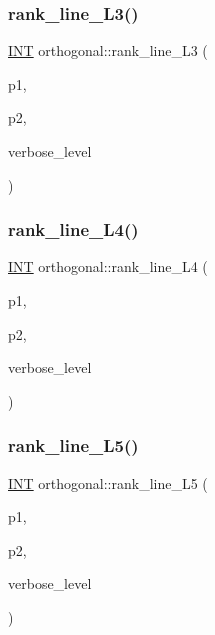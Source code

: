 \subsubsection{\texorpdfstring{rank\+\_\+line\+\_\+\+L3()}{rank\_line\_L3()}}
{\footnotesize\ttfamily \mbox{\hyperlink{galois_8h_a09fddde158a3a20bd2dcadb609de11dc}{I\+NT}} orthogonal\+::rank\+\_\+line\+\_\+\+L3 (\begin{DoxyParamCaption}\item[{\mbox{\hyperlink{galois_8h_a09fddde158a3a20bd2dcadb609de11dc}{I\+NT}}}]{p1,  }\item[{\mbox{\hyperlink{galois_8h_a09fddde158a3a20bd2dcadb609de11dc}{I\+NT}}}]{p2,  }\item[{\mbox{\hyperlink{galois_8h_a09fddde158a3a20bd2dcadb609de11dc}{I\+NT}}}]{verbose\+\_\+level }\end{DoxyParamCaption})}

\mbox{\label{classorthogonal_a80dc34bc12588a8b6e70cf00cd9558a6}} 
\subsubsection{\texorpdfstring{rank\+\_\+line\+\_\+\+L4()}{rank\_line\_L4()}}
{\footnotesize\ttfamily \mbox{\hyperlink{galois_8h_a09fddde158a3a20bd2dcadb609de11dc}{I\+NT}} orthogonal\+::rank\+\_\+line\+\_\+\+L4 (\begin{DoxyParamCaption}\item[{\mbox{\hyperlink{galois_8h_a09fddde158a3a20bd2dcadb609de11dc}{I\+NT}}}]{p1,  }\item[{\mbox{\hyperlink{galois_8h_a09fddde158a3a20bd2dcadb609de11dc}{I\+NT}}}]{p2,  }\item[{\mbox{\hyperlink{galois_8h_a09fddde158a3a20bd2dcadb609de11dc}{I\+NT}}}]{verbose\+\_\+level }\end{DoxyParamCaption})}

\mbox{\label{classorthogonal_a80bcc065004ef76b70cef437fff6f54c}} 
\subsubsection{\texorpdfstring{rank\+\_\+line\+\_\+\+L5()}{rank\_line\_L5()}}
{\footnotesize\ttfamily \mbox{\hyperlink{galois_8h_a09fddde158a3a20bd2dcadb609de11dc}{I\+NT}} orthogonal\+::rank\+\_\+line\+\_\+\+L5 (\begin{DoxyParamCaption}\item[{\mbox{\hyperlink{galois_8h_a09fddde158a3a20bd2dcadb609de11dc}{I\+NT}}}]{p1,  }\item[{\mbox{\hyperlink{galois_8h_a09fddde158a3a20bd2dcadb609de11dc}{I\+NT}}}]{p2,  }\item[{\mbox{\hyperlink{galois_8h_a09fddde158a3a20bd2dcadb609de11dc}{I\+NT}}}]{verbose\+\_\+level }\end{DoxyParamCaption})}

